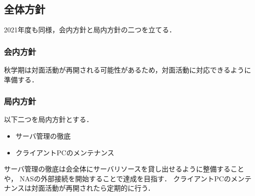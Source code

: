 \subsection*{全体方針}


2021年度も同様，会内方針と局内方針の二つを立てる．

\subsubsection*{会内方針}
秋学期は対面活動が再開される可能性があるため，対面活動に対応できるように準備する．

\subsubsection*{局内方針}
以下二つを局内方針とする．
\begin{itemize}
  \item サーバ管理の徹底
  \item クライアントPCのメンテナンス
\end{itemize}
サーバ管理の徹底は会全体にサーバリソースを貸し出せるように整備することや，
NASの外部接続を開始することで達成を目指す．
クライアントPCのメンテナンスは対面活動が再開されたら定期的に行う．

